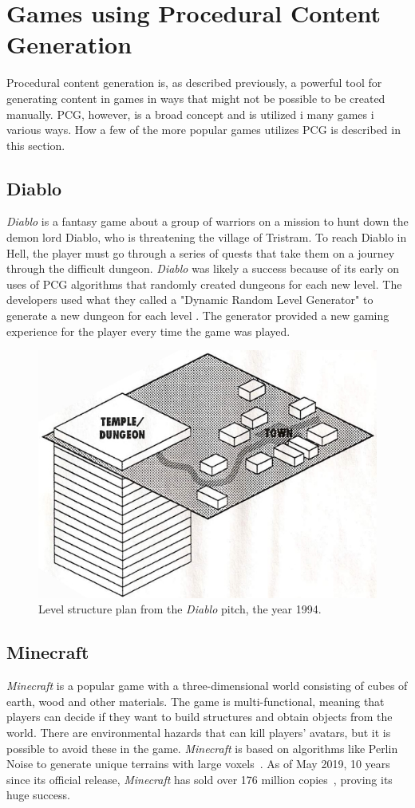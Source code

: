 \section{Games using Procedural Content Generation}
Procedural content generation is, as described previously, a powerful tool for generating content in games in ways that might not be possible to be created manually. PCG, however, is a broad concept and is utilized i many games i various ways. How a few of the more popular games utilizes PCG is described in this section. 

\subsection{Diablo}
\textit{Diablo} is a fantasy game about a group of warriors on a mission to hunt down the demon lord Diablo, who is threatening the village of Tristram. To reach Diablo in Hell, the player must go through a series of quests that take them on a journey through the difficult dungeon. \textit{Diablo} was likely a success because of its early on uses of PCG algorithms that randomly created dungeons for each new level. The developers used what they called a "Dynamic Random Level Generator" to generate a new dungeon for each level \cite{Diablo_PCG}. The generator provided a new gaming experience for the player every time the game was played. 

\begin{figure}[H]
    \centering
    \includegraphics[width=0.5\linewidth]{Planning report/images/diablo.jpg}
    \caption{Level structure plan from the \textit{Diablo} pitch, the year 1994.}
    \label{fig:diablo_plan}
\end{figure}{}


\subsection{Minecraft}
\textit{Minecraft} is a popular game with a three-dimensional world consisting of cubes of earth, wood and other materials. The game is multi-functional, meaning that players can decide if they want to build structures and obtain objects from the world. There are environmental hazards that can kill players' avatars, but it is possible to avoid these in the game. \textit{Minecraft} is based on algorithms like Perlin Noise to generate unique terrains with large voxels~\cite{minecraft_PCG}. As of May 2019, 10 years since its official release, \textit{Minecraft} has sold over 176 million copies~\cite{Minecraft_10ys}, proving its huge success.

